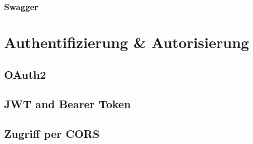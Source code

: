 \subsubsection*{Swagger}
\label{sssec:Swagger}

\section{Authentifizierung \& Autorisierung}
\label{sec:server-authorisierung}

\subsection{OAuth2}
\label{ssec:oauth2}

\subsection{JWT and Bearer Token}
\label{ssec:jwt-bearer}

\subsection{Zugriff per CORS}
\label{ssec:cors}